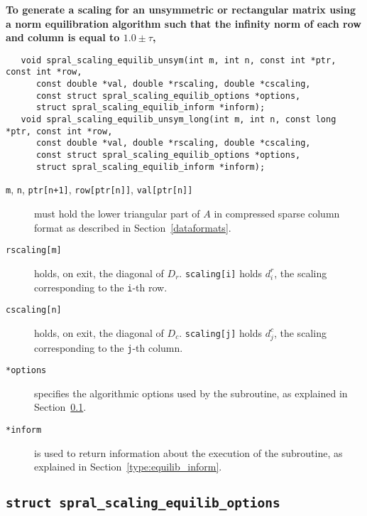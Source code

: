 \textbf{\noindent
   To generate a scaling for an unsymmetric or rectangular matrix using a norm equilibration algorithm such that the infinity norm of each row and column is equal to $1.0\pm\tau$,
}
\vspace*{-0.1cm}
\begin{verbatim}
   void spral_scaling_equilib_unsym(int m, int n, const int *ptr, const int *row,
      const double *val, double *rscaling, double *cscaling,
      const struct spral_scaling_equilib_options *options,
      struct spral_scaling_equilib_inform *inform);
   void spral_scaling_equilib_unsym_long(int m, int n, const long *ptr, const int *row,
      const double *val, double *rscaling, double *cscaling,
      const struct spral_scaling_equilib_options *options,
      struct spral_scaling_equilib_inform *inform);
\end{verbatim}

\begin{description}

\item[\texttt{m}, \texttt{n}, \texttt{ptr[n+1]}, \texttt{row[ptr[n]]}, \texttt{val[ptr[n]]}] must hold the lower triangular part of $A$ in compressed sparse column format as described in Section~\ref{dataformats}.

\item[\texttt{rscaling[m]}] holds, on exit, the diagonal of $D_r$.
\texttt{scaling[i]} holds $d_i^r$, the scaling corresponding to the
\texttt{i}-th row.

\item[\texttt{cscaling[n]}] holds, on exit, the diagonal of $D_c$.
\texttt{scaling[j]} holds $d_j^c$, the scaling corresponding to the
\texttt{j}-th column.

\item[\texttt{*options}] specifies the algorithmic options used by the subroutine, as explained in Section~\ref{type:equilib_options}.

\item[\texttt{*inform}] is used to return information about the execution of the subroutine, as explained in Section~\ref{type:equilib_inform}.


\end{description}

\subsection{\texttt{struct spral\_scaling\_equilib\_options}} \label{type:equilib_options}

